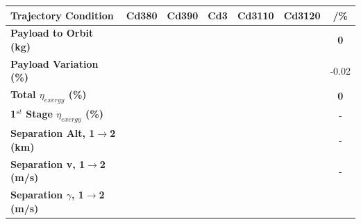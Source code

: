 \begin{table}[ht]
	\centering
	\begin{tabular}{l c c c c c c} 
		\hline \textbf{Trajectory Condition}
		&Cd380
		&Cd390
		&Cd3
		&Cd3110
		&Cd3120
		& /\%
		\\
		\hline \textbf{Payload to Orbit (kg)}
		& \textbf{\PayloadToOrbitCdThreeEightyNoReturn}
		& \textbf{\PayloadToOrbitCdThreeNinetyNoReturn}
		& \textbf{\PayloadToOrbitCdThreeStandardNoReturn}
		& \textbf{\PayloadToOrbitCdThreeOneHundredTenNoReturn}
		& \textbf{\PayloadToOrbitCdThreeOneHundredTwentyNoReturn}
		&\textbf{0}
		\\
		\textbf{Payload Variation (\%)}
		& \PayloadVarCdThreeEightyNoReturn
		& \PayloadVarCdThreeNinetyNoReturn
		& \PayloadVarCdThreeStandardNoReturn
		& \PayloadVarCdThreeOneHundredTenNoReturn
		& \PayloadVarCdThreeOneHundredTwentyNoReturn
		&-0.02
		\\
		\textbf{Total $\eta_{exergy}$ (\%)}
		& \textbf{\totalExergyEffCdThreeEightyNoReturn}
		& \textbf{\totalExergyEffCdThreeNinetyNoReturn}
		& \textbf{\totalExergyEffCdThreeStandardNoReturn}
		& \textbf{\totalExergyEffCdThreeOneHundredTenNoReturn}
		& \textbf{\totalExergyEffCdThreeOneHundredTwentyNoReturn}
		& \textbf{0}
		\\
		\hline 
		\textbf{1$^{st}$ Stage $\eta_{exergy}$ (\%)}
		& \textbf{\firstExergyEffCdThreeEightyNoReturn}
		& \textbf{\firstExergyEffCdThreeNinetyNoReturn}
		& \textbf{\firstExergyEffCdThreeStandardNoReturn}
		& \textbf{\firstExergyEffCdThreeOneHundredTenNoReturn}
		& \textbf{\firstExergyEffCdThreeOneHundredTwentyNoReturn}
		& -
		\\
		\textbf{Separation Alt, 1$\rightarrow$2 (km)}
		& \firstsecondSeparationAltCdThreeEightyNoReturn
		& \firstsecondSeparationAltCdThreeNinetyNoReturn
		& \firstsecondSeparationAltCdThreeStandardNoReturn
		& \firstsecondSeparationAltCdThreeOneHundredTenNoReturn
		& \firstsecondSeparationAltCdThreeOneHundredTwentyNoReturn
		& -
		\\
		\textbf{Separation v, 1$\rightarrow$2 (m/s)}
		& \firstsecondSeparationvCdThreeEightyNoReturn
		& \firstsecondSeparationvCdThreeNinetyNoReturn
		& \firstsecondSeparationvCdThreeStandardNoReturn
		& \firstsecondSeparationvCdThreeOneHundredTenNoReturn
		& \firstsecondSeparationvCdThreeOneHundredTwentyNoReturn
		& -
		\\
		\textbf{Separation $\gamma$, 1$\rightarrow$2 (m/s)}
		& \firstsecondSeparationgammaCdThreeEightyNoReturn
		& \firstsecondSeparationgammaCdThreeNinetyNoReturn
		& \firstsecondSeparationgammaCdThreeStandardNoReturn

\end{tabular}
\end{table}
